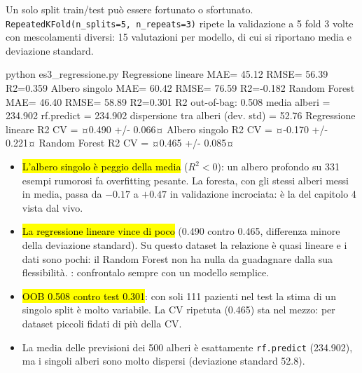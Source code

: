 \begin{tecnica}
Un solo split train/test può essere fortunato o sfortunato. \texttt{RepeatedKFold(n\_splits=5, n\_repeats=3)} ripete la validazione a 5 fold 3 volte con mescolamenti diversi: 15 valutazioni per modello, di cui si riportano media e deviazione standard.
\end{tecnica}

\begin{terminale}{python es3_regressione.py}
Regressione lineare  MAE= 45.12  RMSE= 56.39  R2=0.359
Albero singolo       MAE= 60.42  RMSE= 76.59  R2=-0.182
Random Forest        MAE= 46.40  RMSE= 58.89  R2=0.301
R2 out-of-bag: 0.508
media alberi = 234.902   rf.predict = 234.902
dispersione tra alberi (dev. std) = 52.76
Regressione lineare  R2 CV = ¤0.490 +/- 0.066¤
Albero singolo       R2 CV = ¤-0.170 +/- 0.221¤
Random Forest        R2 CV = ¤0.465 +/- 0.085¤
\end{terminale}

\begin{esempio}
\begin{itemize}
  \item \hl{L'albero singolo è peggio della media} ($R^2<0$): un albero profondo su 331 esempi rumorosi fa overfitting pesante. La foresta, con gli stessi alberi messi in media, passa da $-0.17$ a $+0.47$ in validazione incrociata: è la  del capitolo 4 vista dal vivo.
  \item \hl{La regressione lineare vince di poco} (0.490 contro 0.465, differenza minore della deviazione standard). Su questo dataset la relazione è quasi lineare e i dati sono pochi: il Random Forest non ha nulla da guadagnare dalla sua flessibilità. : confrontalo sempre con un modello semplice.
  \item \hl{OOB 0.508 contro test 0.301}: con soli 111 pazienti nel test la stima di un singolo split è molto variabile. La CV ripetuta (0.465) sta nel mezzo: per dataset piccoli fidati di più della CV.
  \item La media delle previsioni dei 500 alberi è esattamente \texttt{rf.predict} (234.902), ma i singoli alberi sono molto dispersi (deviazione standard 52.8).
\end{itemize}
\end{esempio}

\par\noindent\begin{minipage}{\linewidth}
\end{minipage}\par

